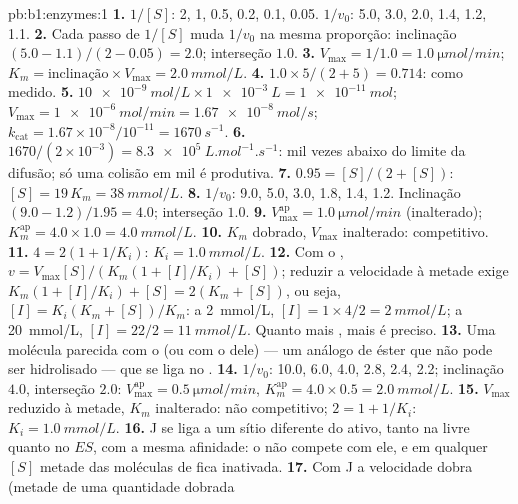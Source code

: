 \begin{solution}{pb:b1:enzymes:1}
\textbf{1.} $1/[S]$: 2, 1, 0.5, 0.2, 0.1, 0.05. $1/v_0$: 5.0, 3.0, 2.0,
1.4, 1.2, 1.1.
\textbf{2.} Cada passo de $1/[S]$ muda $1/v_0$ na mesma proporção:
inclinação $(5.0 - 1.1)/(2 - 0.05) = 2.0$; interseção $1.0$.
\textbf{3.} $V_{\max} = 1/1.0 = \qty{1.0}{\micro mol/min}$; $K_m =
\text{inclinação}\times V_{\max} = \qty{2.0}{mmol/L}$.
\textbf{4.} $1.0\times 5/(2 + 5) = 0.714$: como medido.
\textbf{5.} $\qty{10e-9}{mol/L}\times\qty{1e-3}{L} = \qty{1e-11}{mol}$;
$V_{\max} = \qty{1e-6}{mol/min} = \qty{1.67e-8}{mol/s}$;
$k_{\text{cat}} = 1.67\times 10^{-8}/10^{-11} = \qty{1670}{s^{-1}}$.
\textbf{6.} $1670/(2\times 10^{-3}) = \qty{8.3e5}{L.mol^{-1}.s^{-1}}$:
mil vezes abaixo do limite da difusão; só uma colisão em mil é
produtiva.
\textbf{7.} $0.95 = [S]/(2 + [S])$: $[S] = 19\,K_m = \qty{38}{mmol/L}$.
\textbf{8.} $1/v_0$: 9.0, 5.0, 3.0, 1.8, 1.4, 1.2. Inclinação $(9.0 -
1.2)/1.95 = 4.0$; interseção $1.0$.
\textbf{9.} $V_{\max}^{\text{ap}} = \qty{1.0}{\micro mol/min}$
(inalterado); $K_m^{\text{ap}} = 4.0\times 1.0 = \qty{4.0}{mmol/L}$.
\textbf{10.} $K_m$ dobrado, $V_{\max}$ inalterado: competitivo.
\textbf{11.} $4 = 2(1 + 1/K_i)$: $K_i = \qty{1.0}{mmol/L}$.
\textbf{12.} Com o , $v = V_{\max}[S]/(K_m(1 + [I]/K_i) +
[S])$; reduzir a velocidade à metade exige $K_m(1 + [I]/K_i) + [S] = 2(K_m +
[S])$, ou seja, $[I] = K_i(K_m + [S])/K_m$: a \qty{2}{mmol/L}, $[I] =
1\times 4/2 = \qty{2}{mmol/L}$; a \qty{20}{mmol/L}, $[I] = 22/2 =
\qty{11}{mmol/L}$. Quanto mais , mais  é preciso.
\textbf{13.} Uma molécula parecida com o  (ou com o  dele) --- um análogo de éster que não pode ser hidrolisado ---
que se liga no .
\textbf{14.} $1/v_0$: 10.0, 6.0, 4.0, 2.8, 2.4, 2.2; inclinação $4.0$,
interseção $2.0$: $V_{\max}^{\text{ap}} = \qty{0.5}{\micro mol/min}$,
$K_m^{\text{ap}} = 4.0\times 0.5 = \qty{2.0}{mmol/L}$.
\textbf{15.} $V_{\max}$ reduzido à metade, $K_m$ inalterado: não
competitivo; $2 = 1 + 1/K_i$: $K_i = \qty{1.0}{mmol/L}$.
\textbf{16.} J se liga a um sítio diferente do ativo, tanto na 
livre quanto no $ES$, com a mesma afinidade: o  não compete com
ele, e em qualquer $[S]$ metade das moléculas de  fica inativada.
\textbf{17.} Com J a velocidade dobra (metade de uma quantidade dobrada

\end{solution}
